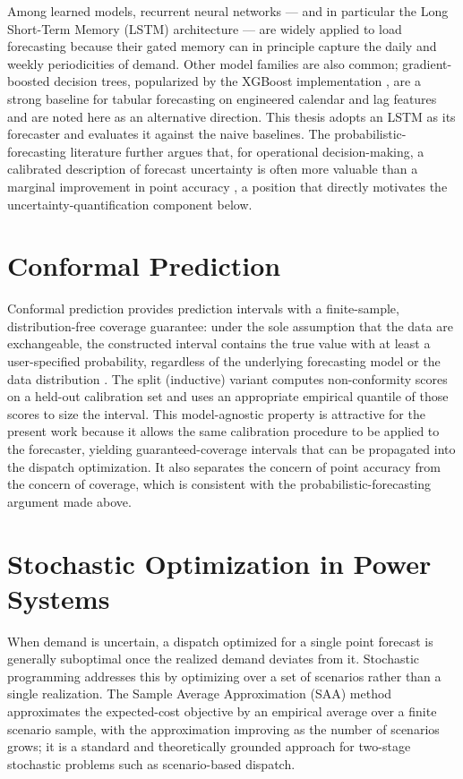 Among learned models, recurrent neural networks --- and in particular the Long Short-Term Memory (LSTM) architecture \cite{hochreiter1997lstm} --- are widely applied to load forecasting because their gated memory can in principle capture the daily and weekly periodicities of demand. Other model families are also common; gradient-boosted decision trees, popularized by the XGBoost implementation \cite{chen2016xgboost}, are a strong baseline for tabular forecasting on engineered calendar and lag features and are noted here as an alternative direction. This thesis adopts an LSTM as its forecaster and evaluates it against the naive baselines. The probabilistic-forecasting literature further argues that, for operational decision-making, a calibrated description of forecast uncertainty is often more valuable than a marginal improvement in point accuracy \cite{hong2016probabilistic}, a position that directly motivates the uncertainty-quantification component below.

\section{Conformal Prediction}

Conformal prediction provides prediction intervals with a finite-sample, distribution-free coverage guarantee: under the sole assumption that the data are exchangeable, the constructed interval contains the true value with at least a user-specified probability, regardless of the underlying forecasting model or the data distribution \cite{vovk2005algorithmic,angelopoulos2022conformal}. The split (inductive) variant computes non-conformity scores on a held-out calibration set and uses an appropriate empirical quantile of those scores to size the interval. This model-agnostic property is attractive for the present work because it allows the same calibration procedure to be applied to the forecaster, yielding guaranteed-coverage intervals that can be propagated into the dispatch optimization. It also separates the concern of point accuracy from the concern of coverage, which is consistent with the probabilistic-forecasting argument made above.

\section{Stochastic Optimization in Power Systems}

When demand is uncertain, a dispatch optimized for a single point forecast is generally suboptimal once the realized demand deviates from it. Stochastic programming addresses this by optimizing over a set of scenarios rather than a single realization. The Sample Average Approximation (SAA) method \cite{shapiro2021saa} approximates the expected-cost objective by an empirical average over a finite scenario sample, with the approximation improving as the number of scenarios grows; it is a standard and theoretically grounded approach for two-stage stochastic problems such as scenario-based dispatch.

